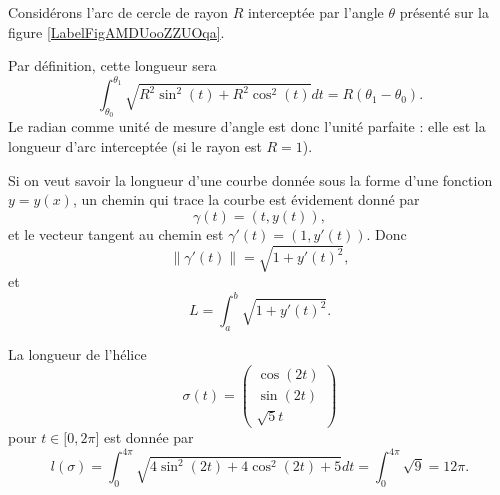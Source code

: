 \begin{example}
    Considérons l'arc de cercle de rayon $R$ interceptée par l'angle $\theta$ présenté sur la figure \ref{LabelFigAMDUooZZUOqa}. %
\newcommand{\CaptionFigAMDUooZZUOqa}{Quelle est la longueur de la partie bleue de ce cercle de rayon $R$ ?}                                            
 
    
    Par définition, cette longueur sera
    \begin{equation}
        \int_{\theta_0}^{\theta_1}\sqrt{R^2\sin^2(t)+R^2\cos^2(t)}dt=R(\theta_1-\theta_0).
    \end{equation}
    Le radian comme unité de mesure d'angle est donc l'unité parfaite : elle est la longueur d'arc interceptée (si le rayon est $R=1$).
\end{example}

\begin{normaltext}
    Si on veut savoir la longueur d'une courbe donnée sous la forme d'une fonction $y=y(x)$, un chemin qui trace la courbe est évidement donné par
    \begin{equation}
        \gamma(t)=(t,y(t)),
    \end{equation}
    et le vecteur tangent au chemin est $\gamma'(t)=(1,y'(t))$. Donc
    \begin{equation}
        \| \gamma'(t) \|=\sqrt{1+y'(t)^2},
    \end{equation}
    et 
    \begin{equation}			\label{EqLongFonction}
        L=\int_a^b\sqrt{1+y'(t)^2}.
    \end{equation}
\end{normaltext}

\begin{example}
    La longueur de l'hélice
    \begin{equation}
        \sigma(t)=\begin{pmatrix}
            \cos(2t)    \\ 
            \sin(2t)    \\ 
            \sqrt{5}t    
        \end{pmatrix}
    \end{equation}
    pour $t\in\mathopen[ 0 , 2\pi \mathclose]$ est donnée par
    \begin{equation}
        l(\sigma)=\int_0^{4\pi}\sqrt{4\sin^2(2t)+4\cos^2(2t)+5}dt=\int_0^{4\pi}\sqrt{9}=12\pi.
    \end{equation}
\end{example}

